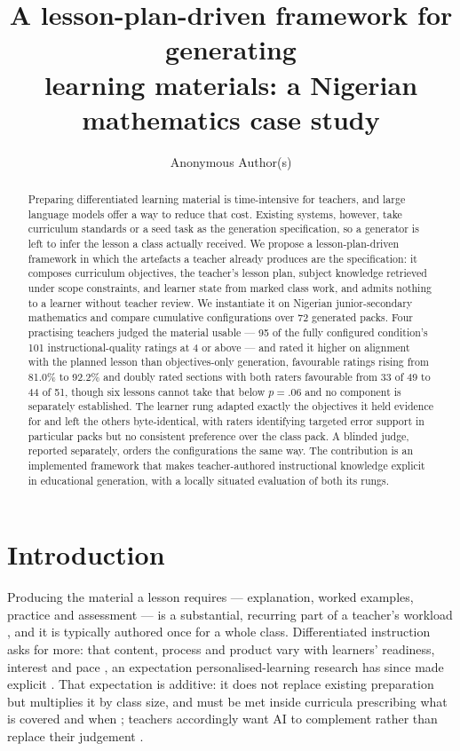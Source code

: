 \documentclass{article}
\title{A lesson-plan-driven framework for generating\\
learning materials: a Nigerian mathematics case study}
\author{Anonymous Author(s)}
\begin{document}
\maketitle

\begin{abstract}
Preparing differentiated learning material is time-intensive for teachers, and large language
models offer a way to reduce that cost. Existing systems, however, take curriculum standards or
a seed task as the generation specification, so a generator is left to infer the lesson a class
actually received. We propose a lesson-plan-driven framework in which the artefacts a teacher
already produces are the specification: it composes curriculum objectives, the teacher's lesson
plan, subject knowledge retrieved under scope constraints, and learner state from marked class
work, and admits nothing to a learner without teacher review. We instantiate it on Nigerian
junior-secondary mathematics and compare cumulative configurations over 72 generated packs.
Four practising teachers judged the material usable --- 95 of the fully configured condition's
101 instructional-quality ratings at 4 or above --- and rated it higher on alignment with the
planned lesson than objectives-only generation, favourable ratings rising from 81.0\% to 92.2\%
and doubly rated sections with both raters favourable from 33 of 49 to 44 of 51, though six
lessons cannot take that below $p=.06$ and no component is separately established. The
learner rung adapted exactly the objectives it held evidence for and left the others
byte-identical, with raters identifying targeted error support in particular packs but no
consistent preference over the class pack. A blinded judge, reported separately, orders the
configurations the same way. The contribution is an implemented framework that makes
teacher-authored instructional knowledge explicit in educational generation, with a locally
situated evaluation of both its rungs.
\end{abstract}

\section{Introduction}

Producing the material a lesson requires --- explanation, worked examples, practice and
assessment --- is a substantial, recurring part of a teacher's workload
\citep{ajayi2015,instructionalagents2025}, and it is typically authored once for a whole class.
Differentiated instruction asks for more: that content, process and product vary with learners'
readiness, interest and pace \citep{tomlinson1999}, an expectation personalised-learning
research has since made explicit \citep{bernacki2021}. That expectation is additive: it does not
replace existing preparation but multiplies it by class size, and must be met inside curricula
prescribing what is covered and when \citep{nikolaidis2024}; teachers accordingly want AI to
complement rather than replace their judgement \citep{seo2024}.
\end{document}
